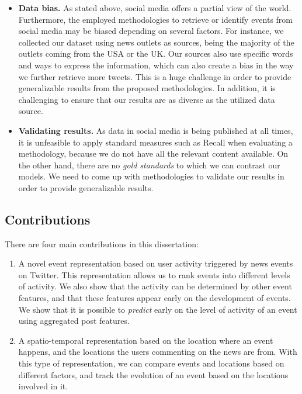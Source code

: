 \begin{intro}
\begin{itemize}
    \item {\bf Data bias.}
    As stated above, social media offers a partial view of the world. 
    Furthermore, the employed methodologies to retrieve or identify events from
    social media may be biased depending on several factors. 
    For instance, we collected our dataset using news outlets as sources, being
    the majority of the outlets coming from the USA or the UK. 
    Our sources also use specific words and ways to express the information,
    which can also create a bias in the way we further retrieve more tweets.
    This is a huge challenge in order to provide generalizable results from the
    proposed methodologies. 
    In addition, it is challenging to ensure that our results are as diverse as the
    utilized data source. 

    \item {\bf Validating results.} 
    As data in social media is being published at all times, it is unfeasible to
    apply standard measures such as Recall when evaluating a methodology,
    because we do not have all the relevant content available.
    On the other hand, there are no {\em gold standards} to which we can
    contrast our models. 
    We need to come up with methodologies to validate our results in order to
    provide generalizable results.

    
\end{itemize}


\subsection*{Contributions} 

There are four main contributions in this dissertation:

\begin{enumerate}
\item A novel event representation based on user activity triggered by news
events on Twitter. 
%
This representation allows us to rank events into different levels of activity. 
%
We also show that the activity can be determined by other event features, and
that these features appear early on the development of events.
%
We show that it is possible to {\em predict} early on the level of activity of
an event using aggregated post features.

\item A spatio-temporal representation based on the location where an event
happens, and the locations the users commenting on the news are from.
%
With this type of representation, we can compare events and locations based on
different factors, and track the evolution of an event based on the locations
involved in it.


\end{enumerate}
\end{intro}
